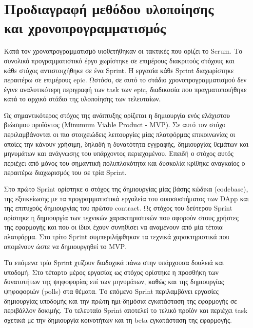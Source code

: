\newpage
\setcounter{section}{8}
\setcounter{section}{7}
\section[Προδιαγραφή μεθόδου υλοποίησης και χρονοπρογραμματισμός]{Προδιαγραφή μεθόδου υλοποίησης \\και χρονοπρογραμματισμός}
\label{section:3-8-implementation-methodology-specification}

Κατά τον χρονοπρογραμματισμό υιοθετήθηκαν οι τακτικές που ορίζει το Scrum. Το συνολικό προγραμματιστικό έργο χωρίστηκε σε επιμέρους διακριτούς στόχους και κάθε στόχος αντιστοιχήθηκε σε ένα Sprint. Η εργασία κάθε Sprint διαχωρίστηκε περαιτέρω σε επιμέρους epic. Ωστόσο, σε αυτό το στάδιο χρονοπρογραμματισμού δεν έγινε αναλυτικότερη περιγραφή των task των epic, διαδικασία που πραγματοποιήθηκε κατά το αρχικό στάδιο της υλοποίησης των τελευταίων.

Ως σημαντικότερος στόχος της ανάπτυξης ορίζεται η δημιουργία ενός ελάχιστου βιώσιμου προϊόντος (Minumum Viable Product - MVP). Σε αυτό τον στόχο περιλαμβάνονται οι πιο στοιχειώδεις λειτουργίες μίας πλατφόρμας επικοινωνίας οι οποίες την κάνουν χρήσιμη, δηλαδή η δυνατότητα εγγραφής, δημιουργίας θεμάτων και μηνυμάτων και ανάγνωσης του υπάρχοντος περιεχομένου. Επειδή ο στόχος αυτός περιέχει από μόνος του σημαντική πολυπλοκότητα και δυσκολία κρίθηκε αναγκαίος ο περαιτέρω διαχωρισμός του σε τρία Sprint.

Στο πρώτο Sprint ορίστηκε ο στόχος της δημιουργίας μίας βάσης κώδικα (codebase), της εξοικείωσης με τα προγραμματιστικά εργαλεία του οικοσυστήματος των DApp και της επιτυχούς δημιουργίας του πρώτου contract. Ως στόχος του δεύτερου Sprint ορίστηκε η δημιουργία των τεχνικών χαρακτηριστικών που αφορούν στους χρήστες της εφαρμογής και που οι ίδιοι έχουν συνηθίσει να αναμένουν από μία τέτοια πλατφόρμα. Στο τρίτο Sprint συμπεριλήφθηκαν τα τεχνικά χαρακτηριστικά που απομένουν ώστε να δημιουργηθεί το MVP.

Τα επόμενα τρία Sprint χτίζουν διαδοχικά πάνω στην υπάρχουσα δουλειά και υποδομή. Στο τέταρτο μέρος εργασίας ως στόχος ορίστηκε η προσθήκη των δυνατοτήτων της ψηφοφορίας επί των μηνυμάτων, καθώς και της δημιουργίας ψηφοφοριών (polls) στα θέματα. Το επόμενο Sprint περιλαμβάνει εργασίες δημιουργίας υποδομής και την πρώτη ημι-δημόσια εγκατάσταση της εφαρμογής σε περιβάλλον δοκιμής. Το τελευταίο Sprint αποτελεί το τελικό προϊόν και περιέχει task σχετικά με την δημιουργία κοινοτήτων και τη beta εγκατάσταση της εφαρμογής.

